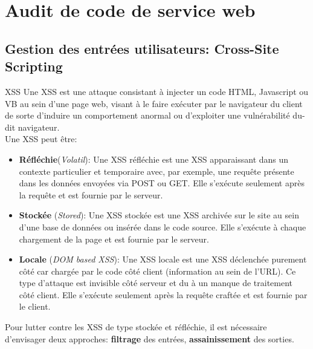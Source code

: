 \documentclass[twoside,a4paper,12pt,titlepage]{book}
\begin{document}
\section{Audit de code de service web}
\subsection{Gestion des entrées utilisateurs: Cross-Site Scripting}
\begin{Define}{XSS}
Une \gls{XSS} est une attaque consistant à injecter un code HTML, Javascript ou VB au sein d'une page web, visant à le faire exécuter par le navigateur du client de sorte d'induire un comportement anormal ou d'exploiter une vulnérabilité du-dit navigateur.\\Une XSS peut être:\begin{itemize}
\item \textbf{Réfléchie}(\textit{Volatil}): Une XSS réfléchie est une XSS apparaissant dans un contexte particulier et temporaire avec, par exemple, une requête présente dans les données envoyées via POST ou GET. Elle s'exécute seulement après la requête et est fournie par le serveur.
\item \textbf{Stockée} (\textit{Stored}): Une XSS stockée est une XSS archivée sur le site au sein d'une base de données ou insérée dans le code source. Elle s'exécute à chaque chargement de la page et est fournie par le serveur.
\item \textbf{Locale} (\textit{DOM based XSS}): Une XSS locale est une XSS déclenchée purement côté car chargée par le code côté client (information au sein de l'URL). Ce type d'attaque est invisible côté serveur et du à un manque de traitement côté client. Elle s'exécute seulement après la requête craftée et est fournie par le client.
\end{itemize}
\end{Define}

Pour lutter contre les XSS de type stockée et réfléchie, il est nécessaire d'envisager deux approches: \textbf{filtrage} des entrées, \textbf{assainissement} des sorties.
\end{document}
